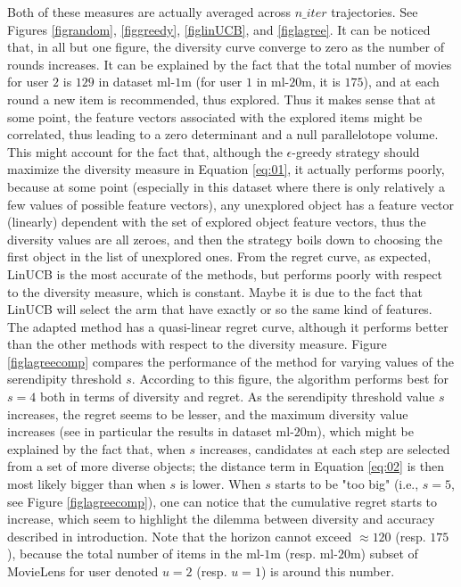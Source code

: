 \documentclass{article}
\begin{document}
Both of these measures are actually averaged across $n\_iter$ trajectories. See Figures \ref{figrandom}, \ref{figgreedy}, \ref{figlinUCB}, and \ref{figlagree}. It can be noticed that, in all but one figure, the diversity curve converge to zero as the number of rounds increases. It can be explained by the fact that the total number of movies for user $2$ is $129$ in dataset $\text{ml-1m}$ (for user $1$ in $\text{ml-20m}$, it is $175$), and at each round a new item is recommended, thus explored. Thus it makes sense that at some point, the feature vectors associated with the explored items might be correlated, thus leading to a zero determinant and a null parallelotope volume. This might account for the fact that, although the $\epsilon$-greedy strategy should maximize the diversity measure in Equation \ref{eq:01}, it actually performs poorly, because at some point (especially in this dataset where there is only relatively a few values of possible feature vectors), any unexplored object has a feature vector (linearly) dependent with the set of explored object feature vectors, thus the diversity values are all zeroes, and then the strategy boils down to choosing the first object in the list of unexplored ones. From the regret curve, as expected, LinUCB is the most accurate of the methods, but performs poorly with respect to the diversity measure, which is constant. Maybe it is due to the fact that LinUCB will select the arm that have exactly or so the same kind of features. The adapted method has a quasi-linear regret curve, although it performs better than the other methods with respect to the diversity measure. Figure \ref{figlagreecomp} compares the performance of the method for varying values of the serendipity threshold $s$. According to this figure, the algorithm performs best for $s=4$ both in terms of diversity and regret. As the serendipity threshold value $s$ increases, the regret seems to be lesser, and the maximum diversity value increases (see in particular the results in dataset $\text{ml-20m}$), which might be explained by the fact that, when $s$ increases, candidates at each step are selected from a set of more diverse objects; the distance term in Equation \ref{eq:02} is then most likely bigger than when $s$ is lower. When $s$ starts to be "too big" (i.e., $s=5$, see Figure \ref{figlagreecomp}), one can notice that the cumulative regret starts to increase, which seem to highlight the dilemma between diversity and accuracy described in introduction. Note that the horizon cannot exceed $\approx 120$ (resp. $175$), because the total number of items in the $\text{ml-1m}$ (resp. $\text{ml-20m}$) subset of MovieLens for user denoted $u=2$ (resp. $u=1$) is around this number. 
\end{document}
